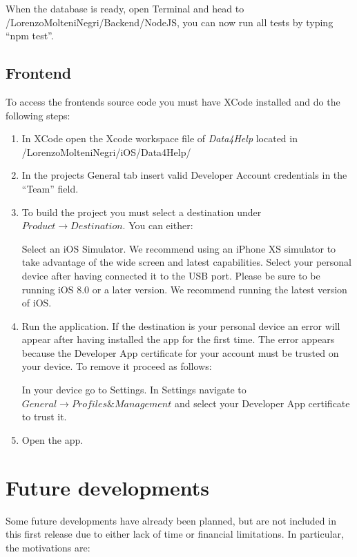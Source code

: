 \documentclass[titlepage]{article}
\begin{document}
	\noindent
	When the database is ready, open Terminal and head to /LorenzoMolteniNegri/Backend/NodeJS, you can now run all tests by typing “npm test”.
	
	\subsection{Frontend}
	To access the frontend\textsc{}s source code you must have XCode installed and do the following steps:
	\begin{enumerate}
		\item In XCode open the Xcode workspace file of {\it Data4Help} located in /LorenzoMolteniNegri/iOS/Data4Help/
		\item In the project\textsc{}s General tab insert valid Developer Account credentials in the “Team” field.
		\item To build the project you must select a destination under $Product \rightarrow Destination$. You can either:
		\begin{tasks}
			\task Select an iOS Simulator. We recommend using an iPhone XS simulator to take advantage of the wide screen and latest capabilities.
			\task Select your personal device after having connected it to the USB port. Please be sure to be running iOS 8.0 or a later version. We recommend running the latest version of iOS.
		\end{tasks}
		\item Run the application. If the destination is your personal device an error will appear after having installed the app for the first time. The error appears because the Developer App certificate for your account must be trusted on your device. To remove it proceed as follows:
		\begin{tasks}
			\task In your device go to Settings.
			\task In Settings navigate to $General\rightarrow Profiles \& Management$ and select your Developer App certificate to trust it.
		\end{tasks}
		\item Open the app.
	\end{enumerate}
	
	\pagebreak
	\section{Future developments}
	Some future developments have already been planned, but are not included in this first release due to either lack of time or financial limitations. In particular, the motivations are:
	
\end{document}
